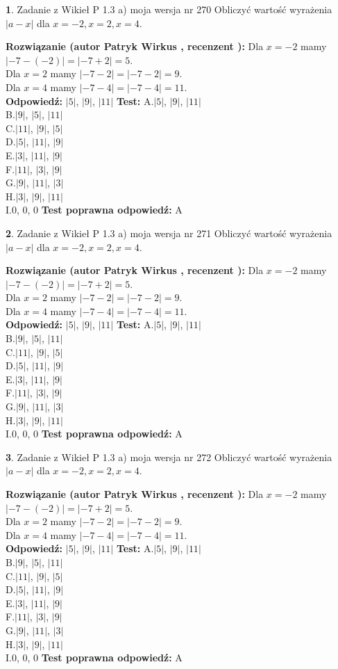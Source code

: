 \documentclass[12pt, a4paper]{article}
\theoremstyle{definition} %
\newtheorem{zad}{}
\newcommand{\zadStart}[1]{\begin{zad}#1\newline}
\newcommand{\zadStop}{\end{zad}}
\newcommand{\rozwStart}[2]{\noindent \textbf{Rozwiązanie (autor #1 , recenzent #2): }\newline}
\newcommand{\rozwStop}{\newline}
\newcommand{\odpStart}{\noindent \textbf{Odpowiedź:}\newline}
\newcommand{\odpStop}{\newline}
\newcommand{\testStart}{\noindent \textbf{Test:}\newline}
\newcommand{\testStop}{\newline}
\newcommand{\kluczStart}{\noindent \textbf{Test poprawna odpowiedź:}\newline}
\newcommand{\kluczStop}{\newline}
\begin{document}
\zadStart{Zadanie z Wikieł P 1.3 a) moja wersja nr 270}
Obliczyć wartość wyrażenia $|a - x|$ dla $x=-2,x=2,x=4$.
\zadStop
\rozwStart{Patryk Wirkus}{}
Dla $x = -2$ mamy $|-7 - (-2)| = |-7 + 2| = 5$.\\
Dla $x = 2$ mamy $|-7 - 2| = |-7 - 2| = 9$.\\
Dla $x = 4$ mamy $|-7 - 4| = |-7 - 4| = 11$.\\
\rozwStop
\odpStart
$|5|$, $|9|$, $|11|$
\odpStop
\testStart
A.$|5|$, $|9|$, $|11|$\\
B.$|9|$, $|5|$, $|11|$\\
C.$|11|$, $|9|$, $|5|$\\
D.$|5|$, $|11|$, $|9|$\\
E.$|3|$, $|11|$, $|9|$\\
F.$|11|$, $|3|$, $|9|$\\
G.$|9|$, $|11|$, $|3|$\\
H.$|3|$, $|9|$, $|11|$\\
I.$0$, $0$, $0$
\testStop
\kluczStart
A
\kluczStop



\zadStart{Zadanie z Wikieł P 1.3 a) moja wersja nr 271}
Obliczyć wartość wyrażenia $|a - x|$ dla $x=-2,x=2,x=4$.
\zadStop
\rozwStart{Patryk Wirkus}{}
Dla $x = -2$ mamy $|-7 - (-2)| = |-7 + 2| = 5$.\\
Dla $x = 2$ mamy $|-7 - 2| = |-7 - 2| = 9$.\\
Dla $x = 4$ mamy $|-7 - 4| = |-7 - 4| = 11$.\\
\rozwStop
\odpStart
$|5|$, $|9|$, $|11|$
\odpStop
\testStart
A.$|5|$, $|9|$, $|11|$\\
B.$|9|$, $|5|$, $|11|$\\
C.$|11|$, $|9|$, $|5|$\\
D.$|5|$, $|11|$, $|9|$\\
E.$|3|$, $|11|$, $|9|$\\
F.$|11|$, $|3|$, $|9|$\\
G.$|9|$, $|11|$, $|3|$\\
H.$|3|$, $|9|$, $|11|$\\
I.$0$, $0$, $0$
\testStop
\kluczStart
A
\kluczStop



\zadStart{Zadanie z Wikieł P 1.3 a) moja wersja nr 272}
Obliczyć wartość wyrażenia $|a - x|$ dla $x=-2,x=2,x=4$.
\zadStop
\rozwStart{Patryk Wirkus}{}
Dla $x = -2$ mamy $|-7 - (-2)| = |-7 + 2| = 5$.\\
Dla $x = 2$ mamy $|-7 - 2| = |-7 - 2| = 9$.\\
Dla $x = 4$ mamy $|-7 - 4| = |-7 - 4| = 11$.\\
\rozwStop
\odpStart
$|5|$, $|9|$, $|11|$
\odpStop
\testStart
A.$|5|$, $|9|$, $|11|$\\
B.$|9|$, $|5|$, $|11|$\\
C.$|11|$, $|9|$, $|5|$\\
D.$|5|$, $|11|$, $|9|$\\
E.$|3|$, $|11|$, $|9|$\\
F.$|11|$, $|3|$, $|9|$\\
G.$|9|$, $|11|$, $|3|$\\
H.$|3|$, $|9|$, $|11|$\\
I.$0$, $0$, $0$
\testStop
\kluczStart
A
\kluczStop
\end{document}
